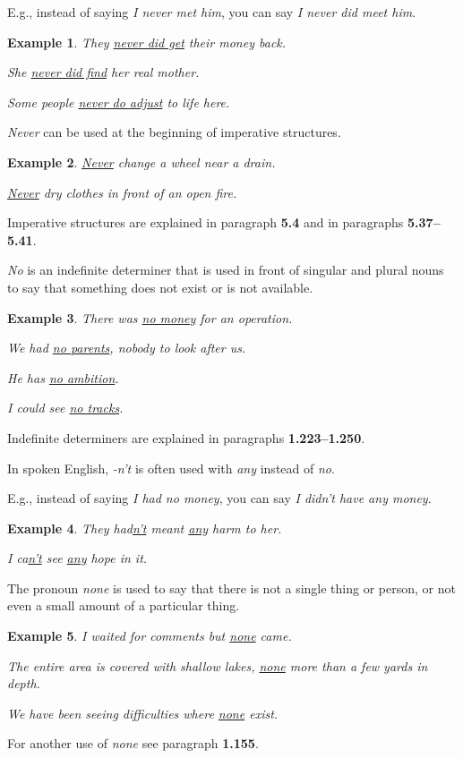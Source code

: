 \documentclass[oneside]{book}
\numberwithin{equation}{section}
\newtheorem{example}{Example}[section]
\begin{document}
E.g., instead of saying \textit{I never met him}, you can say \textit{I never did meet him}.
\begin{example}
    They \underline{never did get} their money back.
    
    She \underline{never did find} her real mother.
    
    Some people \underline{never do adjust} to life here.
\end{example}
%
\noindent{} \textit{Never} can be used at the beginning of imperative structures.
\begin{example}
    \underline{Never} change a wheel near a drain.
    
    \underline{Never} dry clothes in front of an open fire.
\end{example}
Imperative structures are explained in paragraph \textbf{5.4} and in paragraphs \textbf{5.37--5.41}.

%
\noindent{} \textit{No} is an indefinite determiner that is used in front of singular and plural nouns to say that something does not exist or is not available.
\begin{example}
    There was \underline{no money} for an operation.
    
    We had \underline{no parents}, nobody to look after us.
    
    He has \underline{no ambition}.
    
    I could see \underline{no tracks}.
\end{example}
Indefinite determiners are explained in paragraphs \textbf{1.223--1.250}.

%
\noindent{} In spoken English, \textit{-n't} is often used with \textit{any} instead of \textit{no}.

E.g., instead of saying \textit{I had no money}, you can say \textit{I didn't have any money}.
\begin{example}
    They had\underline{n't} meant \underline{any} harm to her.
    
    I ca\underline{n't} see \underline{any} hope in it.
\end{example}
%
\noindent{} The pronoun \textit{none} is used to say that there is not a single thing or person, or not even a small amount of a particular thing.
\begin{example}
    I waited for comments but \underline{none} came.
    
    The entire area is covered with shallow lakes, \underline{none} more than a few yards in depth.
    
    We have been seeing difficulties where \underline{none} exist.
\end{example}
For another use of \textit{none} see paragraph \textbf{1.155}.
\end{document}
